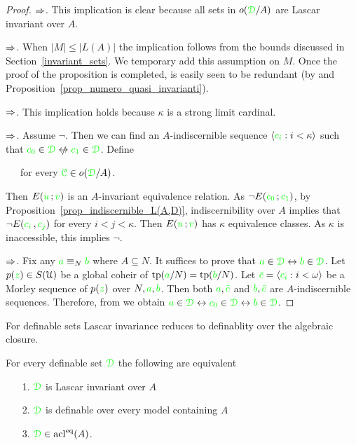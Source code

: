\begin{proof}
  $\Rightarrow$. This implication is clear because all sets in $o({\color{green}\EuScript D}/A)$ are Lascar invariant over $A$. 
  
  $\Rightarrow$. When $|M|\le|L(A)|$ the implication follows from the bounds discussed in Section~\ref{invariant_sets}.
We temporary add this assumption on $M$.
Once the proof of the proposition is completed, is easily seen to be redundant (by  and Proposition~\ref{prop_numero_quasi_invarianti}). 
  
  $\Rightarrow$. This implication holds because $\kappa$ is a strong limit cardinal.

  $\Rightarrow$. Assume $\neg$.
Then we can find an $A\mbox{-}$indiscernible sequence $\langle{\color{green}c_i}:i<\kappa\rangle$ such that ${\gr c_0}\in\grD\niff {\gr c_1}\in\grD$.
Define

  \ \ \ for every ${\color{green}\EuScript C}\in o({\color{green}\EuScript D}/A)$.

  Then $E({\color{green} u}\,;{\color{green} v})$ is an $A\mbox{-}$invariant equivalence relation.
As $\neg E({\color{green} c_0}\,;{\color{green} c_1})$, by Proposition~\ref{prop_indiscernible_L(A,D)}, indiscernibility over $A$ implies that $\neg E({\color{green} c_i\,},{\color{green} c_j})$ for every $i<j<\kappa$.
Then $E({\color{green} u}\,;{\color{green} v})$ has $\kappa$ equivalence classes.
As $\kappa$ is inaccessible, this implies $\neg$.

  $\Rightarrow$. Fix any ${\color{green} a}\equiv_N{\color{green} b}$ where $A\subseteq N$.
It suffices to prove that ${\color{green} a}\in{\color{green}\EuScript D}\leftrightarrow{\color{green}b}\in{\color{green}\EuScript D}$.
Let $p({\color{green} z})\in S(\EuScript U)$ be a global coheir of ${\rm tp}({\color{green} a}/N)={\rm tp}({\color{green} b}/N)$.
Let ${\color{green}\bar c}=\langle{\color{green}c_i}:i<\omega\rangle$ be a Morley sequence of $p({\color{green} z})$ over $N,{\color{green} a},{\color{green} b}$.
Then both ${\color{green} a},{\color{green}\bar c}$ and ${\color{green} b},{\color{green}\bar c}$ are $A\mbox{-}$indiscernible sequences.
Therefore, from  we obtain ${\color{green} a}\in{\color{green}\EuScript D}\leftrightarrow{\color{green}c_0}\in{\color{green}\EuScript D}\leftrightarrow{\color{green}b}\in{\color{green}\EuScript D}$. 
\end{proof}

For definable sets Lascar invariance reduces to definablity over the algebraic closure.

\begin{corollary}\label{coroll_defble_Lascar_inv}
For every definable set ${\color{green}\EuScript D}$ the following are equivalent
  \begin{itemize}
    \item[1.] ${\color{green}\EuScript D}$ is Lascar invariant over $A$
    \item[2.] ${\color{green}\EuScript D}$ is definable over every model containing $A$
    \item[3.] ${\color{green}\EuScript D}\in\mathop{\rm acl}^{{\rm eq}}(A)$.
  \end{itemize}
\end{corollary}

